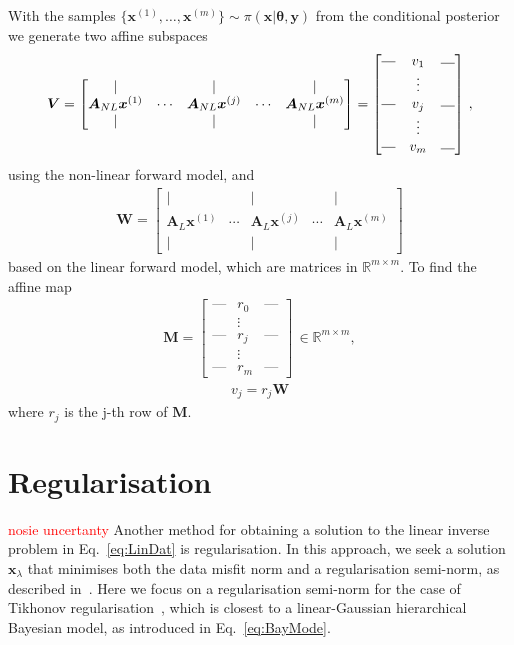 With the samples $\{\bm{x}^{(1)} ,\dots, \bm{x}^{(m)}\}\sim \pi(\bm{x}|\bm{\theta}, \bm{y}) $ from the conditional posterior we generate two affine subspaces
\begin{align}
	\bm{V} = \begin{bmatrix}
		\vert&   &  \vert & & \vert \\
		\bm{A}_{NL}\bm{x}^{(1)} &  \cdots& \bm{A}_{NL}\bm{x}^{(j)} &  \cdots & \bm{A}_{NL} \bm{x}^{(m)}  \\
		\vert&   &  \vert & & \vert 
	\end{bmatrix} = 
	\begin{bmatrix}
		\rule[.5ex]{1em}{0.4pt} & v_1 &	\rule[.25ex]{1em}{0.4pt}\\
		&\vdots  & \\
		\rule[.5ex]{1em}{0.4pt} &v_j &	\rule[.25ex]{1em}{0.4pt}\\
		&\vdots  & \\
		\rule[.5ex]{1em}{0.4pt}& v_m&	\rule[.25ex]{1em}{0.4pt}
	\end{bmatrix} \, ,
\end{align} 
using the non-linear forward model, and 
\begin{align}
	\bm{W} = \begin{bmatrix}
		\vert&   &  \vert & & \vert \\
		\bm{A}_{L} \bm{x}^{(1)} &  \cdots& \bm{A}_{L} \bm{x}^{(j)} &  \cdots & \bm{A}_{L} \bm{x}^{(m)} \\
		\vert&   &  \vert & & \vert 
	\end{bmatrix}
\end{align}
based on the linear forward model, which are matrices in $\mathbb{R}^{m \times m}$.
To find the affine map \begin{align}
	\bm{M} = \begin{bmatrix}
		\text{---} & r_0 &   \text{---}  \\
		&  \vdots  & \\
		\text{---}& r_j &  \text{---} \\
		&  \vdots  & \\
		\text{---} & r_m &   \text{---}
	\end{bmatrix} \, \in \mathbb{R}^{m \times m} ,
\end{align}
\begin{align}
	v_j = r_j \bm{W}
\end{align}
where $r_j$ is the j-th row of $\bm{M}$.

\section{Regularisation}
\label{sec:regularise}
\textcolor{red}{nosie uncertanty}
Another method for obtaining a solution to the linear inverse problem in Eq.~\ref{eq:LinDat} is regularisation. In this approach, we seek a solution $\bm{x}_{\lambda}$ that minimises both the data misfit norm and a regularisation semi-norm, as described in~\cite{fox2016fast}. Here we focus on a regularisation semi-norm for the case of Tikhonov regularisation~\cite{kaipio2005statinv, tan2016LecNot}, which is closest to a linear-Gaussian hierarchical Bayesian model, as introduced in Eq.~\ref{eq:BayMode}.

